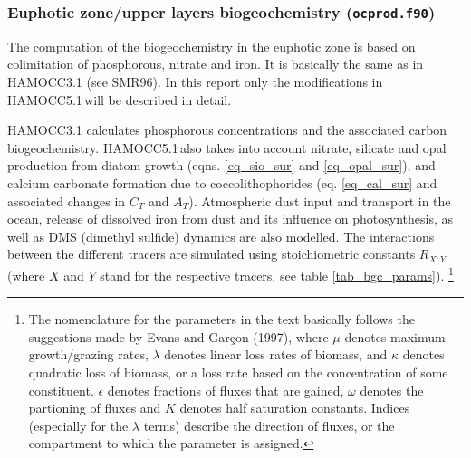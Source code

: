 \documentclass[11pt,a4paper,fleqn,twoside]{article}
\newcommand{\ham}{HAMOCC5.1\,}
\begin{document}
\subsubsection{\label{euphotic_zone}Euphotic zone/upper layers biogeochemistry 
({\tt ocprod.f90})} 

The computation of the biogeochemistry in the euphotic zone is based on colimitation of  phosphorous, nitrate and iron. It is basically the same as in HAMOCC3.1 (see SMR96).
In this report only the modifications in \ham will be described in detail. 

HAMOCC3.1 calculates phosphorous concentrations and the associated carbon
biogeochemistry. \ham also takes into account nitrate, silicate and opal
production from diatom growth (eqns. \ref{eq_sio_sur} and \ref{eq_opal_sur}),
and calcium carbonate formation due to coccolithophorides (eq. \ref{eq_cal_sur}
and associated changes in $C_T$ and $A_T$).  Atmospheric dust input and transport
in the ocean, release of dissolved iron from dust and its influence on
photosynthesis, as well as DMS (dimethyl sulfide) dynamics are also modelled. The
interactions between the different tracers are simulated using stoichiometric
constants $R_{X:Y}$ (where $X$ and $Y$ stand for the respective tracers, see
table \ref{tab_bgc_params}). \footnote{The nomenclature for the parameters in
the text basically follows the suggestions made by Evans and Gar\c{c}on
(1997)\nocite{jgofs:1997}, where $\mu$ denotes maximum growth/grazing rates,
$\lambda$ denotes linear loss rates of biomass, and $\kappa$ denotes 
quadratic loss of biomass, or a loss rate based on the concentration of some
constituent. $\epsilon$ denotes fractions of fluxes that are gained, $\omega$
denotes the partioning of fluxes and $K$ denotes half saturation constants.
Indices (especially for the $\lambda$ terms) describe the direction of fluxes,
or the compartment to which the parameter is assigned.}
\end{document}
